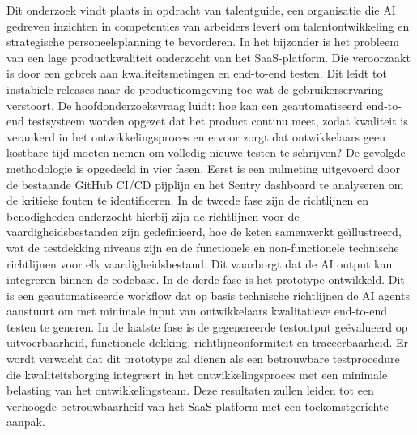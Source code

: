 \documentclass[dutch,dit,thesis]{hogentreport}
\begin{document}
Dit onderzoek vindt plaats in opdracht van talentguide, een organisatie die AI gedreven inzichten in competenties van arbeiders levert om talentontwikkeling en strategische personeelsplanning te bevorderen. In het bijzonder is het probleem van een lage productkwaliteit onderzocht van het SaaS-platform. Die veroorzaakt is door een gebrek aan kwaliteitsmetingen en end-to-end testen. Dit leidt tot instabiele releases naar de productieomgeving toe wat de gebruikerservaring verstoort.
De hoofdonderzoeksvraag luidt: hoe kan een geautomatiseerd end-to-end testsysteem worden opgezet dat het product continu meet, zodat kwaliteit is verankerd in het ontwikkelingsproces en ervoor zorgt dat ontwikkelaars geen kostbare tijd moeten nemen om volledig nieuwe testen te schrijven?
De gevolgde methodologie is opgedeeld in vier fasen. Eerst is een nulmeting uitgevoerd door de bestaande GitHub CI/CD pijplijn en het Sentry dashboard te analyseren om de kritieke fouten te identificeren.
In de tweede fase zijn de richtlijnen en benodigheden onderzocht hierbij zijn de richtlijnen voor de vaardigheidsbestanden zijn gedefinieerd, hoe de keten samenwerkt geïllustreerd, wat de testdekking niveaus zijn en de functionele en non-functionele technische richtlijnen voor elk vaardigheidsbestand. Dit waarborgt dat de AI output kan integreren binnen de codebase.
In de derde fase is het prototype ontwikkeld. Dit is een geautomatiseerde workflow dat op basis technische richtlijnen de AI agents aanstuurt om met minimale input van ontwikkelaars kwalitatieve end-to-end testen te generen. 
In de laatste fase is de gegenereerde testoutput geëvalueerd op uitvoerbaarheid, functionele dekking, richtlijnconformiteit en traceerbaarheid.
Er wordt verwacht dat dit prototype zal dienen als een betrouwbare testprocedure die kwaliteitsborging integreert in het ontwikkelingsproces met een minimale belasting van het ontwikkelingsteam. Deze resultaten zullen leiden tot een verhoogde betrouwbaarheid van het SaaS-platform met een toekomstgerichte aanpak.






\backmatter{}

\setlength\bibitemsep{2pt} %
\printbibliography[heading=bibintoc]
\end{document}

